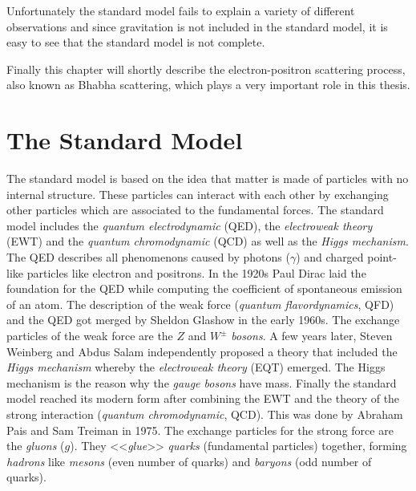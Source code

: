 \documentclass[a4paper,11pt,twosided,final,german,openbib,pdftex,listof=totoc,bibliography=totoc]{scrbook}
\begin{document}
 Unfortunately the standard model fails to explain a variety of different observations and since gravitation is not included in the standard model, it is easy to see that the standard model is not complete.
 
 
 Finally this chapter will shortly describe the electron-positron scattering process, also known as Bhabha scattering, which plays a very important role in this thesis.
 
 
\section{The Standard Model}
\label{sec:SM}

The standard model is based on the idea that matter is made of particles with no internal structure. These particles can interact with each other by exchanging other particles which are associated to the fundamental forces. The standard model includes the \textit{quantum electrodynamic} (QED), the \textit{electroweak theory} (EWT) and the \textit{quantum chromodynamic} (QCD) as well as the \textit{Higgs mechanism}.\\

The QED describes all phenomenons caused by photons ($\gamma$) and charged point-like particles like electron and positrons. In the 1920s Paul Dirac laid the foundation for the QED while computing the coefficient of spontaneous emission of an atom. The description of the weak force (\textit{quantum flavordynamics}, QFD) and the QED got merged by Sheldon Glashow in the early 1960s. The exchange particles of the weak force are the $Z$ and $W^{\pm}$ \textit{bosons}. A few years later, Steven Weinberg and Abdus Salam independently proposed a theory that included the \textit{Higgs mechanism} whereby the \textit{electroweak theory} (EQT) emerged. The Higgs mechanism is the reason why the \textit{gauge bosons} have mass.
Finally the standard model reached its modern form after combining the EWT and the theory of the strong interaction (\textit{quantum chromodynamic}, QCD). This was done by Abraham Pais and Sam Treiman in 1975. The exchange particles for the strong force are the \textit{gluons} ($g$). They <<\textit{glue}>> \textit{quarks} (fundamental particles) together, forming \textit{hadrons} like \textit{mesons} (even number of quarks) and \textit{baryons} (odd number of quarks). \cite{RiseStandard} \\ 
\end{document}
